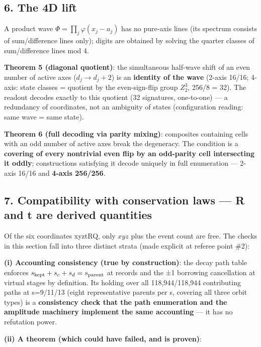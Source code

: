 \documentclass[
]{ltjsarticle}
\begin{document}
\subsection{6. The 4D lift}\label{the-4d-lift}

A product wave \(\Phi=\prod_j\varphi(x_j-a_j)\) has no pure-axis lines
(its spectrum consists of sum/difference lines only); digits are
obtained by solving the quarter classes of sum/difference lines mod 4.

\textbf{Theorem 5 (diagonal quotient)}: the simultaneous half-wave shift
of an even number of active axes (\(d_j\to d_j+2\)) is an
\textbf{identity of the wave} (2-axis 16/16; 4-axis: state classes =
quotient by the even-sign-flip group \(Z_2^3\), 256/8 = 32). The readout
decodes exactly to this quotient (32 signatures, one-to-one) --- a
redundancy of coordinates, not an ambiguity of states (configuration
reading: same wave = same state).

\textbf{Theorem 6 (full decoding via parity mixing)}: composites
containing cells with an odd number of active axes break the degeneracy.
The condition is a \textbf{covering of every nontrivial even flip by an
odd-parity cell intersecting it oddly}; constructions satisfying it
decode uniquely in full enumeration --- 2-axis 16/16 and \textbf{4-axis
256/256}.

\subsection{7. Compatibility with conservation laws --- R and t are
derived
quantities}\label{compatibility-with-conservation-laws-r-and-t-are-derived-quantities}

Of the six coordinates xyztRQ, only \(xyz\) plus the event count are
free. The checks in this section fall into three distinct strata (made
explicit at referee point \#2):

\textbf{(i) Accounting consistency (true by construction)}: the decay
path table enforces \(s_{\rm kept}+s_c+s_d=s_{\rm parent}\) at records
and the ±1 borrowing cancellation at virtual stages by definition. Its
holding over all 118,944/118,944 contributing paths at s=9/11/13 (eight
representative parents per s, covering all three orbit types) is a
\textbf{consistency check that the path enumeration and the amplitude
machinery implement the same accounting} --- it has no refutation power.

\textbf{(ii) A theorem (which could have failed, and is proven)}:
\end{document}
